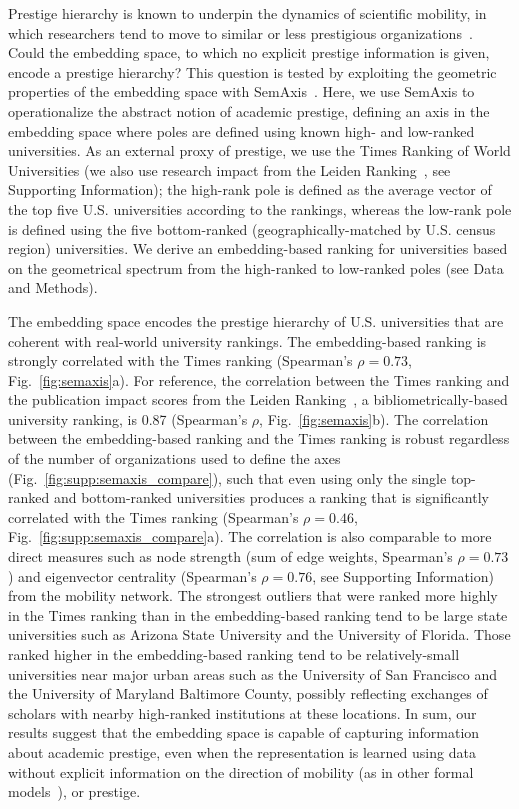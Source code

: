 \documentclass[12pt]{article} %
\def\SI{Supporting Information}
\begin{document}
Prestige hierarchy is known to underpin the dynamics of scientific mobility, in which researchers tend to move to similar or less prestigious organizations~\autocite{deville2014career, clauset2015hierarchy}. Could the embedding space, to which no explicit prestige information is given, encode a prestige hierarchy?
This question is tested by exploiting the geometric properties of the embedding space with SemAxis~\autocite{an2018semaxis}.
Here, we use SemAxis to operationalize the abstract notion of academic prestige, defining an axis in the embedding space where poles are defined using known high- and low-ranked universities.
As an external proxy of prestige, we use the Times Ranking of World Universities (we also use research impact from the Leiden Ranking~\autocite{waltman2012leidenrankings}, see \SI);
the high-rank pole is defined as the average vector of the top five U.S. universities according to the rankings, whereas the low-rank pole is defined using the five bottom-ranked (geographically-matched by U.S. census region) universities.
We derive an embedding-based ranking for universities based on the geometrical spectrum from the high-ranked to low-ranked poles (see Data and Methods).

The embedding space encodes the prestige hierarchy of U.S. universities that are coherent with real-world university rankings.
The embedding-based ranking is strongly correlated with the Times ranking (Spearman's $\rho = 0.73$, Fig.~\ref{fig:semaxis}a).
For reference, the correlation between the Times ranking and the publication impact scores from the Leiden Ranking~\autocite{waltman2012leidenrankings}, a bibliometrically-based university ranking, is 0.87 (Spearman's $\rho$, Fig.~\ref{fig:semaxis}b).
The correlation between the embedding-based ranking and the Times ranking is robust regardless of the number of organizations used to define the axes (Fig.~\ref{fig:supp:semaxis_compare}), such that even using only the single top-ranked and bottom-ranked universities produces a ranking that is significantly correlated with the Times ranking (Spearman's $\rho = 0.46$, Fig.~\ref{fig:supp:semaxis_compare}a).
The correlation is also comparable to more direct measures such as node strength (sum of edge weights, Spearman's $\rho = 0.73$) and eigenvector centrality (Spearman's $\rho = 0.76$, see \SI) from the mobility network.
The strongest outliers that were ranked more highly in the Times ranking than in the embedding-based ranking tend to be large state universities such as Arizona State University and the University of Florida.
Those ranked higher in the embedding-based ranking tend to be relatively-small universities near major urban areas such as the University of San Francisco and the University of Maryland Baltimore County, possibly reflecting exchanges of scholars with nearby high-ranked institutions at these locations.
In sum, our results suggest that the embedding space is capable of capturing information about academic prestige, even when the representation is learned using data without explicit information on the direction of mobility (as in other formal models~\autocite{clauset2015hierarchy}), or prestige.
\end{document}
